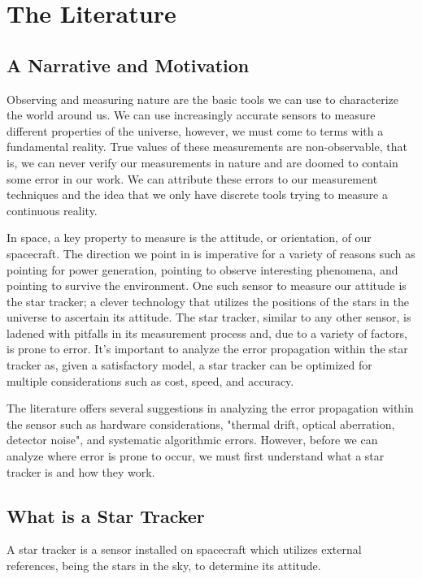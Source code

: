 \chapter{The Literature}

\section{A Narrative and Motivation}
\par \qquad Observing and measuring nature are the basic tools we can use to characterize the world around us.
We can use increasingly accurate sensors to measure different properties of the universe, however, we must come to terms with a fundamental reality.
True values of these measurements are non-observable, that is, we can never verify our measurements in nature and are doomed to contain some error in our work.
We can attribute these errors to our measurement techniques and the idea that we only have discrete tools trying to measure a continuous reality.

\par \qquad In space, a key property to measure is the attitude, or orientation, of our spacecraft.
The direction we point in is imperative for a variety of reasons such as pointing for power generation, pointing to observe interesting phenomena, and pointing to survive the environment.
One such sensor to measure our attitude is the star tracker; a clever technology that utilizes the positions of the stars in the universe to ascertain its attitude.
The star tracker, similar to any other sensor, is ladened with pitfalls in its measurement process and, due to a variety of factors, is prone to error.
It's important to analyze the error propagation within the star tracker as, given a satisfactory model, a star tracker can be optimized for multiple considerations such as cost, speed, and accuracy.

\par \qquad The literature offers several suggestions in analyzing the error propagation within the sensor such as hardware considerations, "thermal drift, optical aberration, detector noise"\cite{systematic_error_analysis_of_star_tracker_centroiding}, and systematic algorithmic errors. However, before we can analyze where error is prone to occur, we must first understand what a star tracker is and how they work.

\section{What is a Star Tracker}
\par \qquad A star tracker is a sensor installed on spacecraft which utilizes external references, being the stars in the sky, to determine its attitude.